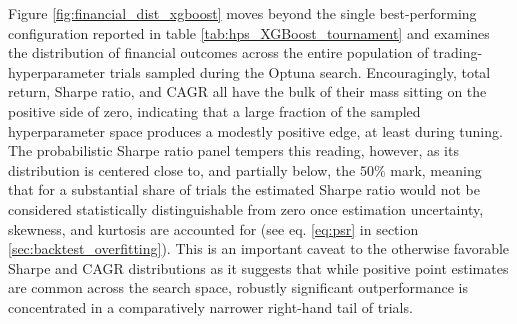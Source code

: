 \documentclass[12pt, a4paper]{article}
\begin{document}
\medskip

Figure \ref{fig:financial_dist_xgboost} moves beyond the single best-performing configuration reported in table \ref{tab:hps_XGBoost_tournament} and examines the distribution of financial 
outcomes across the entire population of trading-hyperparameter trials sampled during the Optuna search. 
Encouragingly, total return, Sharpe ratio, and CAGR all have the bulk of their mass sitting on the positive side of zero, indicating that a large fraction of the sampled 
hyperparameter space produces a modestly positive edge, at least during tuning. 
The probabilistic Sharpe ratio panel tempers this reading, however, as its distribution is centered close to, and partially below, the $50\%$ mark, 
meaning that for a substantial share of trials the estimated Sharpe ratio would not be considered statistically distinguishable from zero once estimation uncertainty, skewness, 
and kurtosis are accounted for (see eq. \ref{eq:psr} in section \ref{sec:backtest_overfitting}). This is an important caveat to the otherwise favorable Sharpe and CAGR distributions as 
it suggests that while positive point estimates are common across the search space, robustly significant outperformance is concentrated in a comparatively narrower right-hand tail of trials.

\medskip
\end{document}
